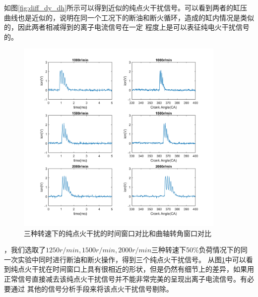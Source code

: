 如图\ref{fig:diff_dy_dh}所示可以得到近似的纯点火干扰信号。可以看到两者的缸压曲线也是近似的，说明在同一个工况下的断油和断火循环，造成的缸内情况是类似的，因此两者相减得到的离子电流信号在一定
程度上是可以表征纯电火干扰信号的。
\begin{figure}[H]
	\centering
	\includegraphics[width=0.9\textwidth]{thesis_figure/ion_chapter/pure_ign_comparison}
	\caption{三种转速下的纯点火干扰的时间窗口对比和曲轴转角窗口对比}
	\label{fig:pure_ign_comparison}
\end{figure}
，我们选取了$1250r/min,1500r/min,2000r/min$三种转速下50\%负荷情况下的同一次实验中同时进行断油和断火操作，得到三个纯点火干扰信号。
从图\ref{fig:pure_ign_comparison}中可以看到纯点火干扰在时间窗口上具有很相近的形状，但是仍然有细节上的差异，如果用正常信号直接减去该纯点火干扰信号并不能非常完美的呈现出离子电流信号。有必要通过
其他的信号分析手段来将该点火干扰信号剔除。
